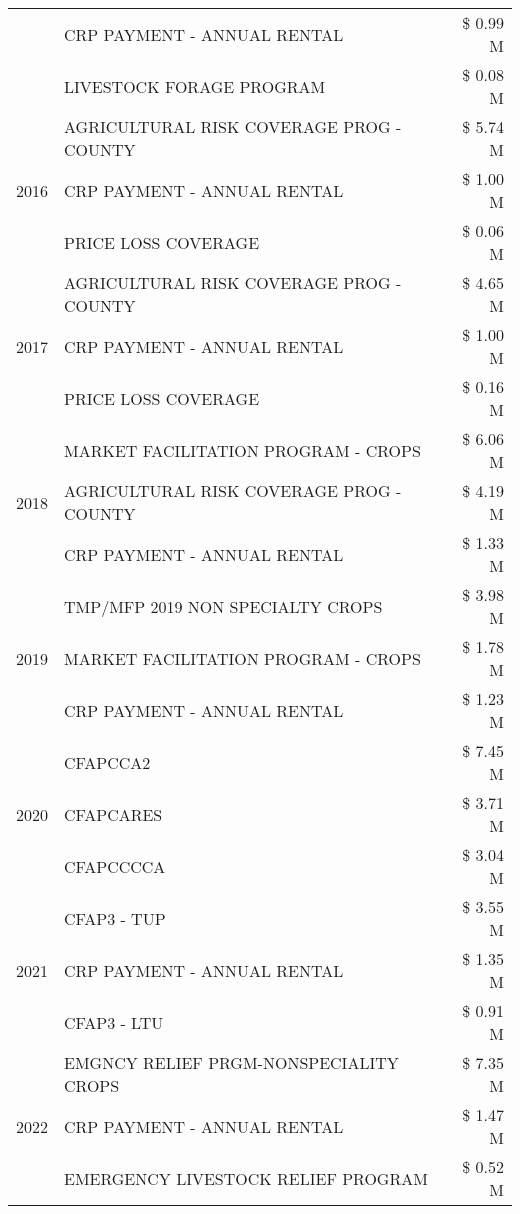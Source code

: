\begin{tabular}{llr}
 & CRP PAYMENT - ANNUAL RENTAL & \$ 0.99 M \\
 & LIVESTOCK FORAGE PROGRAM & \$ 0.08 M \\
\cline{1-3}
\multirow[t]{3}{*}{2016} & AGRICULTURAL RISK COVERAGE PROG - COUNTY & \$ 5.74 M \\
 & CRP PAYMENT - ANNUAL RENTAL & \$ 1.00 M \\
 & PRICE LOSS COVERAGE & \$ 0.06 M \\
\cline{1-3}
\multirow[t]{3}{*}{2017} & AGRICULTURAL RISK COVERAGE PROG - COUNTY & \$ 4.65 M \\
 & CRP PAYMENT - ANNUAL RENTAL & \$ 1.00 M \\
 & PRICE LOSS COVERAGE & \$ 0.16 M \\
\cline{1-3}
\multirow[t]{3}{*}{2018} & MARKET FACILITATION PROGRAM - CROPS & \$ 6.06 M \\
 & AGRICULTURAL RISK COVERAGE PROG - COUNTY & \$ 4.19 M \\
 & CRP PAYMENT - ANNUAL RENTAL & \$ 1.33 M \\
\cline{1-3}
\multirow[t]{3}{*}{2019} & TMP/MFP 2019 NON SPECIALTY CROPS & \$ 3.98 M \\
 & MARKET FACILITATION PROGRAM - CROPS & \$ 1.78 M \\
 & CRP PAYMENT - ANNUAL RENTAL & \$ 1.23 M \\
\cline{1-3}
\multirow[t]{3}{*}{2020} & CFAPCCA2 & \$ 7.45 M \\
 & CFAPCARES & \$ 3.71 M \\
 & CFAPCCCCA & \$ 3.04 M \\
\cline{1-3}
\multirow[t]{3}{*}{2021} & CFAP3 - TUP & \$ 3.55 M \\
 & CRP PAYMENT - ANNUAL RENTAL & \$ 1.35 M \\
 & CFAP3 - LTU & \$ 0.91 M \\
\cline{1-3}
\multirow[t]{3}{*}{2022} & EMGNCY RELIEF PRGM-NONSPECIALITY CROPS & \$ 7.35 M \\
 & CRP PAYMENT - ANNUAL RENTAL & \$ 1.47 M \\
 & EMERGENCY LIVESTOCK RELIEF PROGRAM & \$ 0.52 M \\
\cline{1-3}
\bottomrule
\end{tabular}
